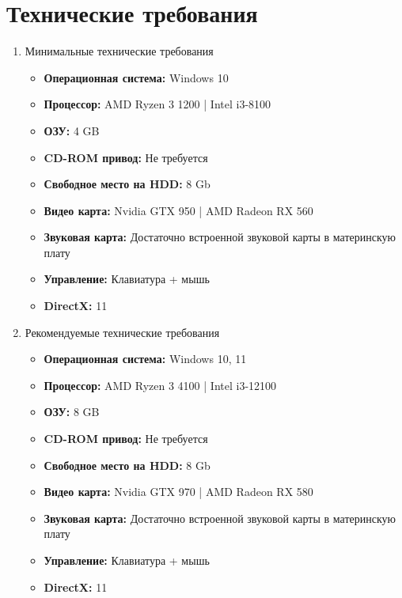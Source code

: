 \documentclass{article}
\begin{document}
\section{Технические требования}
\begin{enumerate}
    \item Минимальные технические требования
    \begin{itemize}
     \item \textbf{Операционная система: } Windows 10
     \item \textbf{Процессор: } AMD Ryzen 3 1200 | Intel i3-8100
     \item \textbf{ОЗУ: } 4 GB
     \item \textbf{CD-ROM привод: } Не требуется
     \item \textbf{Свободное место на HDD: } 8 Gb
     \item \textbf{Видео карта: } Nvidia GTX 950 | AMD Radeon RX 560
     \item \textbf{Звуковая карта: } Достаточно встроенной звуковой карты в материнскую плату
     \item \textbf{Управление: } Клавиатура + мышь
     \item \textbf{DirectX: } 11
    \end{itemize}
    \item Рекомендуемые технические требования
    \begin{itemize}
     \item \textbf{Операционная система: } Windows 10, 11 
     \item \textbf{Процессор: } AMD Ryzen 3 4100 | Intel i3-12100
     \item \textbf{ОЗУ: } 8 GB
     \item \textbf{CD-ROM привод: } Не требуется
     \item \textbf{Свободное место на HDD: } 8 Gb
     \item \textbf{Видео карта: } Nvidia GTX 970 | AMD Radeon RX 580
     \item \textbf{Звуковая карта: } Достаточно встроенной звуковой карты в материнскую плату
     \item \textbf{Управление: } Клавиатура + мышь
     \item \textbf{DirectX: } 11
    \end{itemize}
\end{enumerate}
\end{document}
